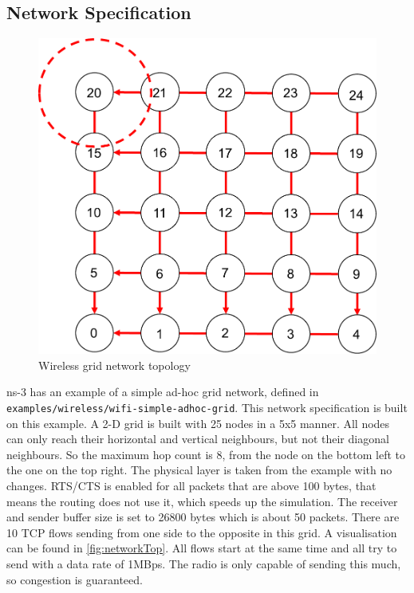 \subsection{Network Specification}\label{subsec:networkspec}
\begin{figure}[h]
	\centering
	\includegraphics[scale=0.45]{networkTopology}
	\caption{Wireless grid network topology}
	\label{fig:networkTop}
\end{figure}
ns-3 has an example of a simple ad-hoc grid network, defined in \texttt{examples/wireless/wifi-simple-adhoc-grid}. This network specification is built on this example. A 2-D grid is built with 25 nodes in a 5x5 manner. All nodes can only reach their horizontal and vertical neighbours, but not their diagonal neighbours. So the maximum hop count is 8, from the node on the bottom left to the one on the top right. The physical layer is taken from the example with no changes. RTS/CTS is enabled for all packets that are above 100 bytes, that means the routing does not use it, which speeds up the simulation. The receiver and sender buffer size is set to 26800 bytes which is about 50 packets. There are 10 TCP flows sending from one side to the opposite in this grid. A visualisation can be found in \autoref{fig:networkTop}. All flows start at the same time and all try to send with a data rate of 1MBps. The radio is only capable of sending this much, so congestion is guaranteed.

